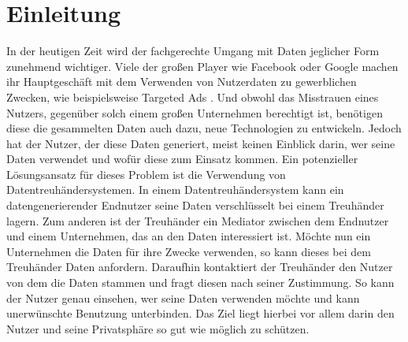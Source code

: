 \documentclass[
	fontsize=12pt,
	headings=small,
	parskip=half,           %
	bibliography=totoc,
	numbers=noenddot,       %
	open=any,               %
]{scrreprt}
\begin{document}
\chapter{Einleitung}
\label{chap:intro}
In der heutigen Zeit wird der fachgerechte Umgang mit Daten jeglicher Form zunehmend wichtiger. Viele der großen Player wie Facebook oder Google machen ihr Hauptgeschäft mit dem Verwenden von Nutzerdaten zu gewerblichen Zwecken, wie beispielsweise Targeted Ads \cite{facebookad,googlead}. Und obwohl das Misstrauen eines Nutzers, gegenüber solch einem großen Unternehmen  berechtigt ist, benötigen diese die gesammelten Daten auch dazu, neue Technologien zu entwickeln. Jedoch hat der Nutzer, der diese Daten generiert, meist keinen Einblick darin, wer seine Daten verwendet und wofür diese zum Einsatz kommen. Ein potenzieller Lösungsansatz für dieses Problem ist die Verwendung von Datentreuhändersystemen. In einem Datentreuhändersystem kann ein datengenerierender Endnutzer seine Daten verschlüsselt bei einem Treuhänder lagern. Zum anderen ist der Treuhänder ein Mediator zwischen dem Endnutzer und einem Unternehmen, das an den Daten interessiert ist. Möchte nun ein Unternehmen die Daten für ihre Zwecke verwenden, so kann dieses bei dem Treuhänder Daten anfordern. Daraufhin kontaktiert der Treuhänder den Nutzer von dem die Daten stammen und fragt diesen nach seiner Zustimmung. So kann der Nutzer genau einsehen, wer seine Daten verwenden möchte und kann unerwünschte Benutzung unterbinden. Das Ziel liegt hierbei vor allem darin den Nutzer und seine Privatsphäre so gut wie möglich zu schützen.
\end{document}
